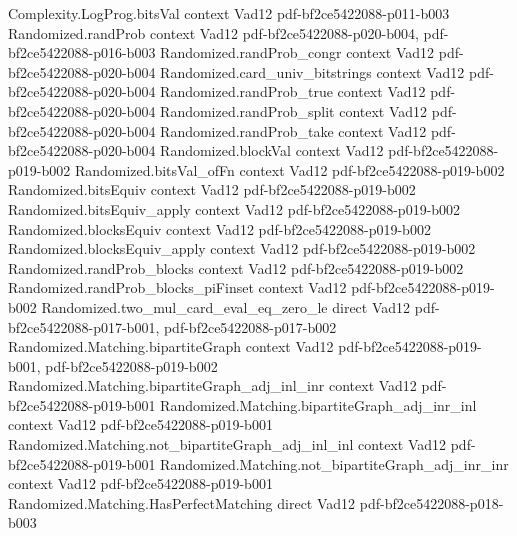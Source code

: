\begin{theorem}
\label{Randomized.Matching.lovasz_test}
\leanok
\proofstep
  {Complexity.LogProg.bitsVal}
  {context}
  {Vad12}
  {pdf-bf2ce5422088-p011-b003}
\proofstep
  {Randomized.randProb}
  {context}
  {Vad12}
  {pdf-bf2ce5422088-p020-b004,
    pdf-bf2ce5422088-p016-b003}
\proofstep
  {Randomized.randProb_congr}
  {context}
  {Vad12}
  {pdf-bf2ce5422088-p020-b004}
\proofstep
  {Randomized.card_univ_bitstrings}
  {context}
  {Vad12}
  {pdf-bf2ce5422088-p020-b004}
\proofstep
  {Randomized.randProb_true}
  {context}
  {Vad12}
  {pdf-bf2ce5422088-p020-b004}
\proofstep
  {Randomized.randProb_split}
  {context}
  {Vad12}
  {pdf-bf2ce5422088-p020-b004}
\proofstep
  {Randomized.randProb_take}
  {context}
  {Vad12}
  {pdf-bf2ce5422088-p020-b004}
\proofstep
  {Randomized.blockVal}
  {context}
  {Vad12}
  {pdf-bf2ce5422088-p019-b002}
\proofstep
  {Randomized.bitsVal_ofFn}
  {context}
  {Vad12}
  {pdf-bf2ce5422088-p019-b002}
\proofstep
  {Randomized.bitsEquiv}
  {context}
  {Vad12}
  {pdf-bf2ce5422088-p019-b002}
\proofstep
  {Randomized.bitsEquiv_apply}
  {context}
  {Vad12}
  {pdf-bf2ce5422088-p019-b002}
\proofstep
  {Randomized.blocksEquiv}
  {context}
  {Vad12}
  {pdf-bf2ce5422088-p019-b002}
\proofstep
  {Randomized.blocksEquiv_apply}
  {context}
  {Vad12}
  {pdf-bf2ce5422088-p019-b002}
\proofstep
  {Randomized.randProb_blocks}
  {context}
  {Vad12}
  {pdf-bf2ce5422088-p019-b002}
\proofstep
  {Randomized.randProb_blocks_piFinset}
  {context}
  {Vad12}
  {pdf-bf2ce5422088-p019-b002}
\proofstep
  {Randomized.two_mul_card_eval_eq_zero_le}
  {direct}
  {Vad12}
  {pdf-bf2ce5422088-p017-b001,
    pdf-bf2ce5422088-p017-b002}
\proofstep
  {Randomized.Matching.bipartiteGraph}
  {context}
  {Vad12}
  {pdf-bf2ce5422088-p019-b001,
    pdf-bf2ce5422088-p019-b002}
\proofstep
  {Randomized.Matching.bipartiteGraph_adj_inl_inr}
  {context}
  {Vad12}
  {pdf-bf2ce5422088-p019-b001}
\proofstep
  {Randomized.Matching.bipartiteGraph_adj_inr_inl}
  {context}
  {Vad12}
  {pdf-bf2ce5422088-p019-b001}
\proofstep
  {Randomized.Matching.not_bipartiteGraph_adj_inl_inl}
  {context}
  {Vad12}
  {pdf-bf2ce5422088-p019-b001}
\proofstep
  {Randomized.Matching.not_bipartiteGraph_adj_inr_inr}
  {context}
  {Vad12}
  {pdf-bf2ce5422088-p019-b001}
\proofstep
  {Randomized.Matching.HasPerfectMatching}
  {direct}
  {Vad12}
  {pdf-bf2ce5422088-p018-b003}

\end{theorem}
